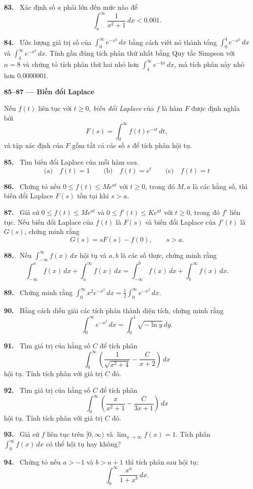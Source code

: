 \documentclass[12pt,a4paper]{article}
\newcommand{\bt}[1]{\par\smallskip\Needspace{5\baselineskip}\noindent\textbf{#1.}\ }
\newcommand{\group}[1]{\par\Needspace{11\baselineskip}\medskip\noindent\textbf{#1}\par\nopagebreak[4]}
\begin{document}
\bt{83} Xác định số $a$ phải lớn đến mức nào để
\[\int_a^\infty\frac1{x^2+1}\,dx<0.001.\]

\bt{84} Ước lượng giá trị số của $\int_0^\infty e^{-x^2}\,dx$ bằng cách viết nó thành tổng $\int_0^4e^{-x^2}\,dx$ và $\int_4^\infty e^{-x^2}\,dx$. Tính gần đúng tích phân thứ nhất bằng Quy tắc Simpson với $n=8$ và chứng tỏ tích phân thứ hai nhỏ hơn $\int_4^\infty e^{-4x}\,dx$, mà tích phân này nhỏ hơn $0.0000001$.

\group{85–87 — Biến đổi Laplace}
Nếu $f(t)$ liên tục với $t\ge0$, \textit{biến đổi Laplace} của $f$ là hàm $F$ được định nghĩa bởi
\[F(s)=\int_0^\infty f(t)e^{-st}\,dt,\]
và tập xác định của $F$ gồm tất cả các số $s$ để tích phân hội tụ.

\bt{85} Tìm biến đổi Laplace của mỗi hàm sau.
\[\text{(a)}\quad f(t)=1\qquad\text{(b)}\quad f(t)=e^t\qquad\text{(c)}\quad f(t)=t\]

\bt{86} Chứng tỏ nếu $0\le f(t)\le Me^{at}$ với $t\ge0$, trong đó $M,a$ là các hằng số, thì biến đổi Laplace $F(s)$ tồn tại khi $s>a$.

\bt{87} Giả sử $0\le f(t)\le Me^{at}$ và $0\le f'(t)\le Ke^{at}$ với $t\ge0$, trong đó $f'$ liên tục. Nếu biến đổi Laplace của $f(t)$ là $F(s)$ và biến đổi Laplace của $f'(t)$ là $G(s)$, chứng minh rằng
\[G(s)=sF(s)-f(0),\qquad s>a.\]

\bt{88} Nếu $\int_{-\infty}^\infty f(x)\,dx$ hội tụ và $a,b$ là các số thực, chứng minh rằng
\[\int_{-\infty}^a f(x)\,dx+\int_a^\infty f(x)\,dx
=\int_{-\infty}^b f(x)\,dx+\int_b^\infty f(x)\,dx.\]

\bt{89} Chứng minh rằng $\displaystyle\int_0^\infty x^2e^{-x^2}\,dx=\frac12\int_0^\infty e^{-x^2}\,dx$.

\bt{90} Bằng cách diễn giải các tích phân thành diện tích, chứng minh rằng
\[\int_0^\infty e^{-x^2}\,dx=\int_0^1\sqrt{-\ln y}\,dy.\]

\bt{91} Tìm giá trị của hằng số $C$ để tích phân
\[\int_0^\infty\left(\frac1{\sqrt{x^2+4}}-\frac C{x+2}\right)\,dx\]
hội tụ. Tính tích phân với giá trị $C$ đó.

\bt{92} Tìm giá trị của hằng số $C$ để tích phân
\[\int_0^\infty\left(\frac{x}{x^2+1}-\frac C{3x+1}\right)\,dx\]
hội tụ. Tính tích phân với giá trị $C$ đó.

\bt{93} Giả sử $f$ liên tục trên $[0,\infty)$ và $\lim_{x\to\infty}f(x)=1$. Tích phân $\int_0^\infty f(x)\,dx$ có thể hội tụ hay không?

\bt{94} Chứng tỏ nếu $a>-1$ và $b>a+1$ thì tích phân sau hội tụ:
\[\int_0^\infty\frac{x^a}{1+x^b}\,dx.\]
\end{document}
